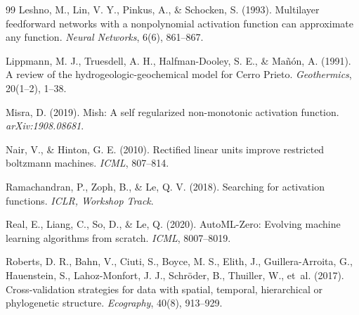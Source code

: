 \documentclass[10pt,twocolumn,letterpaper]{article}
\begin{document}
\begin{thebibliography}{99}
Leshno, M., Lin, V. Y., Pinkus, A., \& Schocken, S. (1993). Multilayer feedforward networks with a nonpolynomial activation function can approximate any function. \emph{Neural Networks}, 6(6), 861--867.

Lippmann, M. J., Truesdell, A. H., Halfman-Dooley, S. E., \& Ma\~n\'on, A. (1991). A review of the hydrogeologic-geochemical model for Cerro Prieto. \emph{Geothermics}, 20(1--2), 1--38.

Misra, D. (2019). Mish: A self regularized non-monotonic activation function. \emph{arXiv:1908.08681}.

Nair, V., \& Hinton, G. E. (2010). Rectified linear units improve restricted boltzmann machines. \emph{ICML}, 807--814.

Ramachandran, P., Zoph, B., \& Le, Q. V. (2018). Searching for activation functions. \emph{ICLR, Workshop Track}.

Real, E., Liang, C., So, D., \& Le, Q. (2020). AutoML-Zero: Evolving machine learning algorithms from scratch. \emph{ICML}, 8007--8019.

Roberts, D. R., Bahn, V., Ciuti, S., Boyce, M. S., Elith, J., Guillera-Arroita, G., Hauenstein, S., Lahoz-Monfort, J. J., Schr{\"o}der, B., Thuiller, W., et~al. (2017). Cross-validation strategies for data with spatial, temporal, hierarchical or phylogenetic structure. \emph{Ecography}, 40(8), 913--929.

\end{thebibliography}
\end{document}
